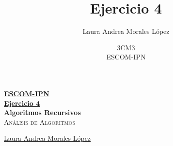 \documentclass[12pt, fleqn]{article}                             %
\author{Laura Andrea Morales López}              %
\title{Ejercicio 4}
\author{3CM3\\
	ESCOM-IPN}
\theoremstyle{break}                                            %
\begin{document}
\begin{titlepage}
    
    \pagecolor{amaranth}                                      %
    \color{classicrose}                                                   %

    \vspace                                                         %
    \baselineskip                                                   %

    \makebox[0pt][l]{\rule{1.3\textwidth}{3pt}}                     %
    
    \href{https://compilandoconocimiento.com}                       %
    {\textbf{\textsc{\Huge ESCOM-IPN}}}\\[2.7cm]                    %

    \href{\ProjectNameLink/LibroRedes}                       %
    {\fontsize{36}{50}                                              %
        \selectfont \textbf{Ejercicio 4}}\\[0.5cm]       %
    {\fontsize{36}{50}                                              %
        \selectfont \textbf{Algoritmos Recursivos}}\\[0.5cm]                %
    \textcolor{bittersweet}                                        %
        {\textsc{\LARGE Análisis de Algoritmos}}     %
    
    \vfill                                                          %
    
    \href{https://compilandoconocimiento.com/}                    %
    {\LARGE \textsf{Laura Andrea Morales López}}   %

    \vspace                                                         %
    \baselineskip                                                   %
    

\end{titlepage}
\end{document}
